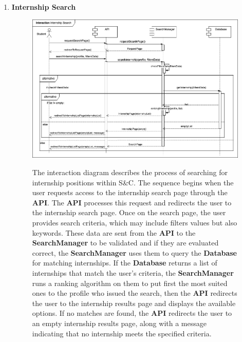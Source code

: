 \begin{enumerate}
    \newpage
    \item \textbf{Internship Search}
    \begin{figure}[h!]
            \centering  \includegraphics[width=1\textwidth]{DD/Images/Interactions/INT05_InternshipSearch.drawio.png}
            \label{fig:ComponentViewDiagram}
            \caption*{The interaction diagram describes the process of searching for internship positions within S\&C. The sequence begins when the user requests access to the internship search page through the \textbf{API}. The \textbf{API} processes this request and redirects the user to the internship search page. Once on the search page, the user provides search criteria, which may include filters values but also keywords. These data are sent from the \textbf{API} to the \textbf{SearchManager} to be validated and if they are evaluated correct, the \textbf{SearchManager} uses them to query the \textbf{Database} for matching internships. If the \textbf{Database} returns a list of internships that match the user's criteria, the \textbf{SearchManager} runs a ranking algorithm on them to put first the most suited ones to the profile who issued the search, then the \textbf{API} redirects the user to the internship results page and displays the available options. If no matches are found, the \textbf{API} redirects the user to an empty internship results page, along with a message indicating that no internship meets the specified criteria. 
            }
    \end{figure}


\end{enumerate}

